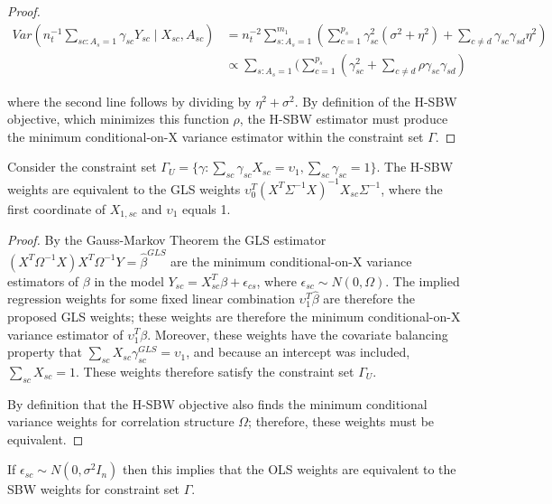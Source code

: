 \begin{proof}
\begin{align}
    Var(n_t^{-1}\sum_{sc: A_s = 1}\gamma_{sc}Y_{sc} \mid X_{sc}, A_{sc}) &= n_t^{-2}\sum_{s: A_s = 1}^{m_1}(\sum_{c = 1}^{p_s}\gamma_{sc}^2(\sigma^2 + \eta^2) + \sum_{c \ne d}\gamma_{sc}\gamma_{sd}\eta^2) \\
    &\propto \sum_{s: A_s = 1}(\sum_{c = 1}^{p_s}(\gamma_{sc}^2 + \sum_{c \ne d}\rho \gamma_{sc}\gamma_{sd})
\end{align}

where the second line follows by dividing by $\eta^2 + \sigma^2$. By definition of the H-SBW objective, which minimizes this function $\rho$, the H-SBW estimator must produce the minimum conditional-on-X variance estimator within the constraint set $\Gamma$.
\end{proof}

\begin{proposition}
    Consider the constraint set $\Gamma_U = \{\gamma: \sum_{sc}\gamma_{sc}X_{sc} = \upsilon_1, \sum_{sc}\gamma_{sc} = 1\}$. The H-SBW weights are equivalent to the GLS weights $\upsilon_0^T(X^T\Sigma^{-1}X)^{-1}X_{sc}\Sigma^{-1}$, where the first coordinate of $X_{1, sc}$ and $\upsilon_1$ equals 1.
\end{proposition}

\begin{proof}
    By the Gauss-Markov Theorem the GLS estimator $(X^T\Omega^{-1}X)X^T\Omega^{-1}Y = \hat{\beta}^{GLS}$ are the minimum conditional-on-X variance estimators of $\beta$ in the model $Y_{sc} = X_{sc}^T\beta + \epsilon_{cs}$, where $\epsilon_{sc} \sim N(0, \Omega)$. The implied regression weights for some fixed linear combination $\upsilon_1^T\hat{\beta}$ are therefore the proposed GLS weights; these weights are therefore the minimum conditional-on-X variance estimator of $\upsilon_1^T\beta$. Moreover, these weights have the covariate balancing property that $\sum_{sc}X_{sc}\gamma_{sc}^{GLS} = \upsilon_1$, and because an intercept was included, $\sum_{sc}X_{sc} = 1$. These weights therefore satisfy the constraint set $\Gamma_U$.
    
    By definition that the H-SBW objective also finds the minimum conditional variance weights for correlation structure $\Omega$; therefore, these weights must be equivalent.
\end{proof}

\begin{remark}
    If $\epsilon_{sc} \sim N(0, \sigma^2I_n)$ then this implies that the OLS weights are equivalent to the SBW weights for constraint set $\Gamma$.
\end{remark}

